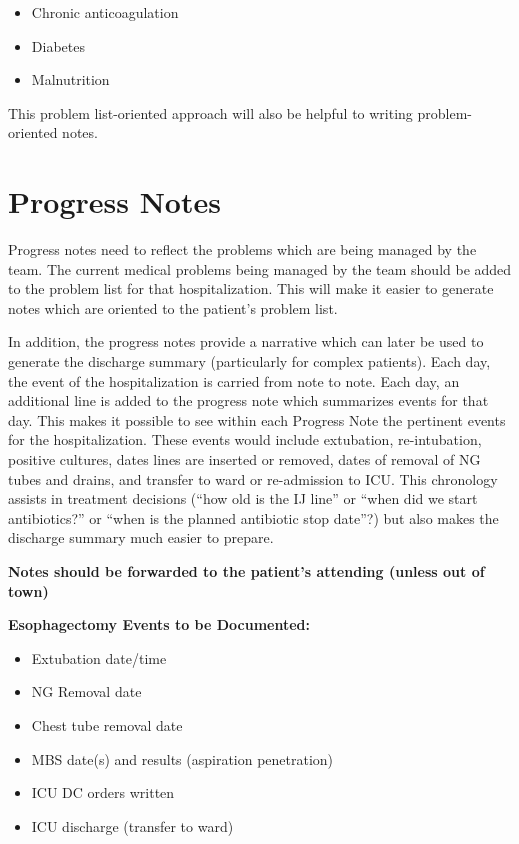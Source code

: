 \documentclass[
]{book}
\providecommand{\tightlist}{%
  \setlength{\itemsep}{0pt}\setlength{\parskip}{0pt}}
\begin{document}
\begin{itemize}
\tightlist
\item
  Chronic anticoagulation
\item
  Diabetes
\item
  Malnutrition
\end{itemize}

This problem list-oriented approach will also be helpful to writing problem-oriented notes.

\hypertarget{progress-notes}{%
\chapter{Progress Notes}\label{progress-notes}}

Progress notes need to reflect the problems which are being managed by the team. The current medical problems being managed by the team should be added to the problem list for that hospitalization. This will make it easier to generate notes which are oriented to the patient's problem list.

In addition, the progress notes provide a narrative which can later be used to generate the discharge summary (particularly for complex patients). Each day, the event of the hospitalization is carried from note to note. Each day, an additional line is added to the progress note which summarizes events for that day. This makes it possible to see within each Progress Note the pertinent events for the hospitalization. These events would include extubation, re-intubation, positive cultures, dates lines are inserted or removed, dates of removal of NG tubes and drains, and transfer to ward or re-admission to ICU. This chronology assists in treatment decisions (``how old is the IJ line'' or ``when did we start antibiotics?'' or ``when is the planned antibiotic stop date''?) but also makes the discharge summary much easier to prepare.

\textbf{Notes should be forwarded to the patient's attending (unless out of town)}

\textbf{Esophagectomy Events to be Documented:}

\begin{itemize}
\tightlist
\item
  Extubation date/time
\item
  NG Removal date
\item
  Chest tube removal date
\item
  MBS date(s) and results (aspiration \textbar{} penetration)
\item
  ICU DC orders written
\item
  ICU discharge (transfer to ward)
\end{itemize}
\end{document}
